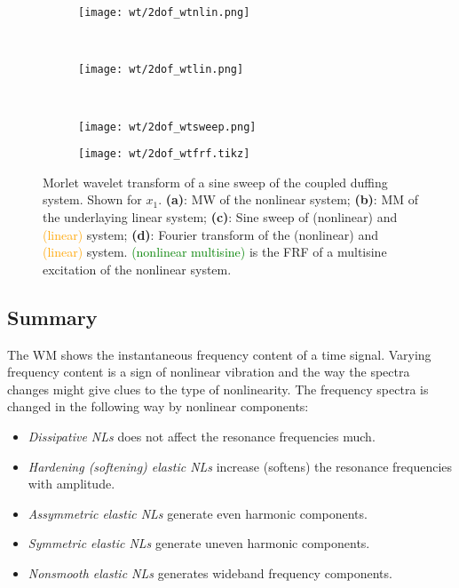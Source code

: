 \begin{figure}[!ht]
  \centering
  \begin{subfigure}[b]{0.48\textwidth}
    \texttt{[image: wt/2dof\_wtnlin.png]}
    \caption{}
  \end{subfigure}
  ~
  \begin{subfigure}[b]{0.48\textwidth}
    \texttt{[image: wt/2dof\_wtlin.png]}
    \caption{}
  \end{subfigure}
  \\
  \begin{subfigure}[b]{0.49\textwidth}
    \texttt{[image: wt/2dof\_wtsweep.png]}
    \caption{}
  \end{subfigure}
  \begin{subfigure}[b]{0.49\textwidth}
    \texttt{[image: wt/2dof\_wtfrf.tikz]}
    \caption{}
  \end{subfigure}
  \caption{Morlet wavelet transform of a sine sweep of the coupled duffing
    system. Shown for $x_1$.
    \textbf{(a)}: MW of the nonlinear system;
    \textbf{(b)}: MM of the underlaying linear system;
    \textbf{(c)}: Sine sweep of
    \sampleline{}(nonlinear) and
    \textcolor{orange}{(linear)} system;
    \textbf{(d)}: Fourier transform of the
    \sampleline{}(nonlinear) and
    \textcolor{orange}{(linear)} system.
    \textcolor{green}{(nonlinear multisine)} is the FRF of a
    multisine excitation of the nonlinear system.
  }
  \label{fig:mw_2dof}
\end{figure}


\subsection{Summary}
\label{sec:wt_transform}

The WM shows the instantaneous frequency content of a time signal. Varying
frequency content is a sign of nonlinear vibration and the way the spectra
changes might give clues to the type of nonlinearity.
The frequency spectra is changed in the following way by nonlinear components:

\begin{itemize}
\item \textit{Dissipative NLs} does not affect the resonance frequencies much.
\item \textit{Hardening (softening) elastic NLs} increase (softens) the resonance
  frequencies with amplitude.
\item \textit{Assymmetric elastic NLs} generate even harmonic components.
\item \textit{Symmetric elastic NLs} generate uneven harmonic components.
\item \textit{Nonsmooth elastic NLs} generates wideband frequency components.
\end{itemize}

